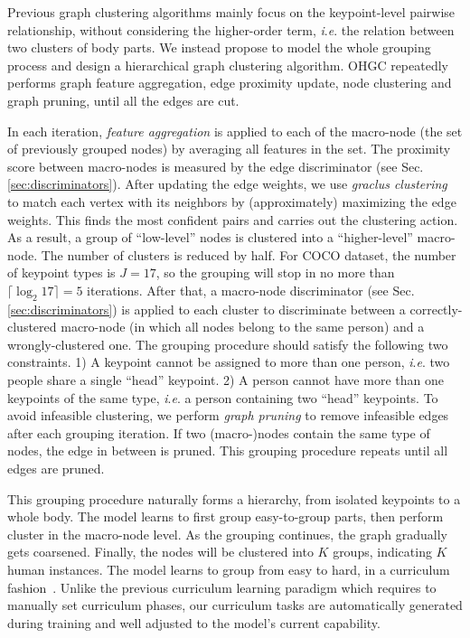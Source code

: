 \documentclass[runningheads]{llncs}
\newcommand{\ie}{\textit{i}.\textit{e}. }
\begin{document}
	Previous graph clustering algorithms mainly focus on the keypoint-level pairwise relationship, without considering the higher-order term, \ie the relation between two clusters of body parts. We instead propose to model the whole grouping process and design a hierarchical graph clustering algorithm. OHGC repeatedly performs graph feature aggregation, edge proximity update, node clustering and graph pruning, until all the edges are cut. 
	
	In each iteration, \emph{feature aggregation} is applied to each of the macro-node (the set of previously grouped nodes) by averaging all features in the set. The proximity score between macro-nodes is measured by the edge discriminator (see Sec.\ref{sec:discriminators}). After updating the edge weights, we use \emph{graclus clustering}~\cite{dhillon2007weighted} to match each vertex with its neighbors by (approximately) maximizing the edge weights. This finds the most confident pairs and carries out the clustering action. As a result, a group of ``low-level'' nodes is clustered into a ``higher-level'' macro-node. The number of clusters is reduced by half. For COCO dataset, the number of keypoint types is $J=17$, so the grouping will stop in no more than $\lceil \log_2 17 \rceil = 5$ iterations. After that, a macro-node discriminator (see Sec.\ref{sec:discriminators}) is applied to each cluster to discriminate between a correctly-clustered macro-node (in which all nodes belong to the same person) and a wrongly-clustered one. The grouping procedure should satisfy the following two constraints. 1) A keypoint cannot be assigned to more than one person, \ie two people share a single ``head'' keypoint. 2) A person cannot have more than one keypoints of the same type, \ie a person containing two ``head'' keypoints. To avoid infeasible clustering, we perform \emph{graph pruning} to remove infeasible edges after each grouping iteration. If two (macro-)nodes contain the same type of nodes, the edge in between is pruned. This grouping procedure repeats until all edges are pruned. 
	
	This grouping procedure naturally forms a hierarchy, from isolated keypoints to a whole body. The model learns to first group easy-to-group parts, then perform cluster in the macro-node level. As the grouping continues, the graph gradually gets coarsened. Finally, the nodes will be clustered into $K$ groups, indicating $K$ human instances. The model learns to group from easy to hard, in a curriculum fashion~\cite{bengio2009curriculum}. Unlike the previous curriculum learning paradigm which requires to manually set curriculum phases, our curriculum tasks are automatically generated during training and well adjusted to the model’s current capability. 
	
\end{document}
